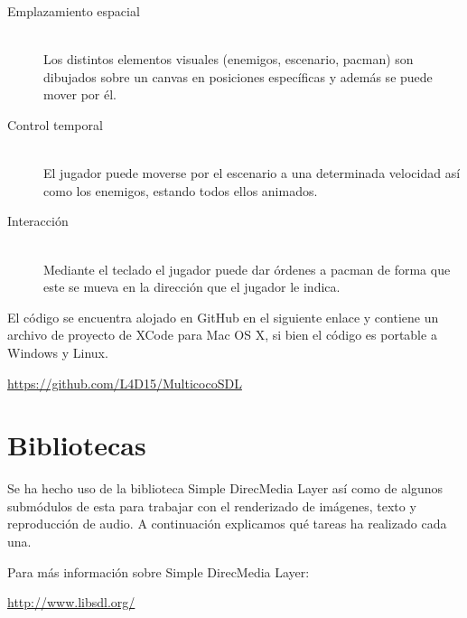 \documentclass[parskip=half*]{scrartcl}
\begin{document}
\begin{description}
	\item[Emplazamiento espacial]	\hfill \\	Los distintos elementos visuales (enemigos, escenario, pacman) son dibujados sobre un canvas en posiciones específicas y además se puede mover por él.
	\item[Control temporal] 		\hfill \\	El jugador puede moverse por el escenario a una determinada velocidad así como los enemigos, estando todos ellos animados.
	\item[Interacci\'on]			\hfill \\	Mediante el teclado el jugador puede dar \'ordenes a pacman de forma que este se mueva en la direcci\'on que el jugador le indica.
\end{description}

El c\'odigo se encuentra alojado en GitHub en el siguiente enlace y contiene un archivo de proyecto de XCode para Mac OS X, si bien el c\'odigo es portable a Windows y Linux. \\

\centerline{\url{https://github.com/L4D15/MulticocoSDL}}


\newpage
\section{Bibliotecas}
Se ha hecho uso de la biblioteca Simple DirecMedia Layer as\'i como de algunos subm\'odulos de esta para trabajar con el renderizado de im\'agenes, texto y reproducci\'on de audio. A continuaci\'on explicamos qu\'e tareas ha realizado cada una.

Para m\'as información sobre Simple DirecMedia Layer: \\

\centerline{\url{http://www.libsdl.org/}}

\end{document}

